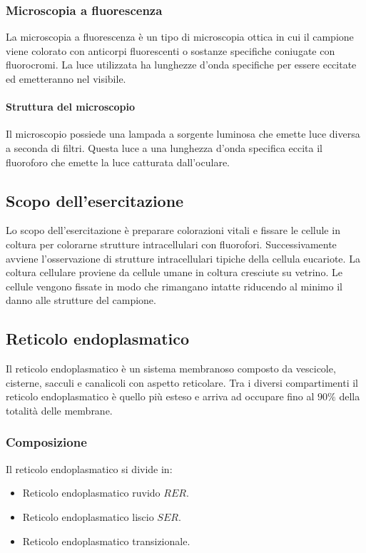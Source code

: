 		\subsubsection{Microscopia a fluorescenza}
		La microscopia a fluorescenza \`e un tipo di microscopia ottica in cui il campione viene colorato con anticorpi fluorescenti o sostanze specifiche coniugate con fluorocromi.
		La luce utilizzata ha lunghezze d'onda specifiche per essere eccitate ed emetteranno nel visibile.

			\paragraph{Struttura del microscopio}
			Il microscopio possiede una lampada a sorgente luminosa che emette luce diversa a seconda di filtri.
			Questa luce a una lunghezza d'onda specifica eccita il fluoroforo che emette la luce catturata dall'oculare.

	\subsection{Scopo dell'esercitazione}
	Lo scopo dell'esercitazione \`e preparare colorazioni vitali e fissare le cellule in coltura per colorarne strutture intracellulari con fluorofori.
	Successivamente avviene l'osservazione di strutture intracellulari tipiche della cellula eucariote.
	La coltura cellulare proviene da cellule umane in coltura cresciute su vetrino.
	Le cellule vengono fissate in modo che rimangano intatte riducendo al minimo il danno alle strutture del campione.

	\subsection{Reticolo endoplasmatico}
	Il reticolo endoplasmatico \`e un sistema membranoso composto da vescicole, cisterne, sacculi e canalicoli con aspetto reticolare.
	Tra i diversi compartimenti il reticolo endoplasmatico \`e quello pi\`u esteso e arriva ad occupare fino al $90\%$ della totalit\`a delle membrane.

		\subsubsection{Composizione}
		Il reticolo endoplasmatico si divide in:
		\begin{multicols}{2}
		\begin{itemize}
			\item Reticolo endoplasmatico ruvido $RER$.
			\item Reticolo endoplasmatico liscio $SER$.
			\item Reticolo endoplasmatico transizionale.
		\end{itemize}
			\end{multicols}

